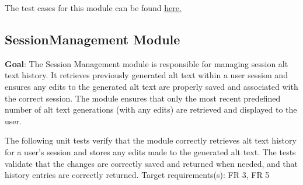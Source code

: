 \documentclass[12pt, titlepage]{article}
\begin{document}
The test cases for this module can be found \href{https://github.com/4G06-CAPSTONE-2025/Reading4All/blob/main/backend/tests/test_auth_service.py}{here.}



\subsection{SessionManagement Module}
\textbf{Goal}:
The Session Management module is responsible for managing session alt text history. 
It retrieves previously generated alt text within a user session and ensures any edits to the generated alt text are properly saved and associated with the correct session.
The module ensures that only the most recent predefined number of alt text generations (with any edits) are retrieved and displayed to the user.  

The following unit tests verify that the module correctly retrieves alt text history for a user's session 
and stores any edits made to the generated alt text. The tests validate that the changes are correctly saved and returned when needed, and that history entries are correctly returned. 
Target requirements(s): FR 3, FR 5
\end{document}
